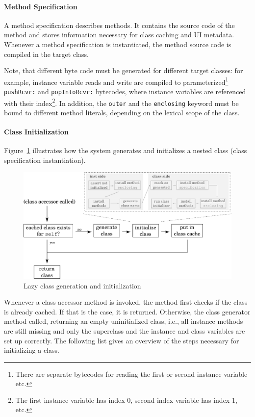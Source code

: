\paragraph{Method Specification}
A method specification describes methods. It contains the source code of the method and stores information necessary for class caching and UI metadata. Whenever a method specification is instantiated, the method source code is compiled in the target class. 

Note, that different byte code must be generated for different target classes: for example, instance variable reads and write are compiled to parameterized\footnote{There are separate bytecodes for reading the first or second instance variable etc.} \texttt{pushRcvr:} and \texttt{popIntoRcvr:} bytecodes, where instance variables are referenced with their index\footnote{The first instance variable has index 0, second index variable has index 1, etc.}. In addition, the \texttt{outer} and the \texttt{enclosing} keyword must be bound to different method literals, depending on the lexical scope of the class.

\paragraph{Class Initialization}
Figure~\ref{fig:lazy_class_gen} illustrates how the system generates and initializes a nested class (class specification instantiation).

\begin{figure}
	\includegraphics[width=\textwidth]{lazy_class_gen.pdf}
	\centering
	\caption{Lazy class generation and initialization}
	\label{fig:lazy_class_gen}
\end{figure}

Whenever a class accessor method is invoked, the method first checks if the class is already cached. If that is the case, it is returned. Otherwise, the class generator method called, returning an empty uninitialized class, i.e., all instance methods are still missing and only the superclass and the instance and class variables are set up correctly. The following list gives an overview of the steps necessary for initializing a class.

